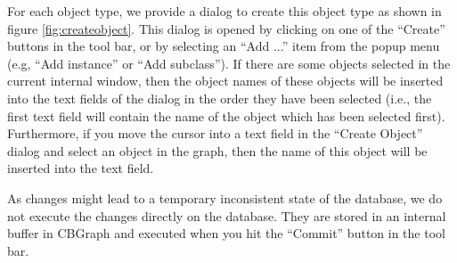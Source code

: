 
For each object type, we provide a dialog to create this object
type as shown in figure \ref{fig:createobject}. This dialog is opened
by clicking on one of the ``Create'' buttons in the tool bar, or by selecting
an ``Add ...'' item from the popup menu (e.g, ``Add instance'' or ``Add subclass'').
If there are some objects selected in the current internal window, then the object names of
these objects will be inserted into the text fields of the dialog in the order they
have been selected (i.e., the first text field will contain the name of the object which
has been selected first). Furthermore, if you move the cursor into a text field in the ``Create Object''
dialog and select an object in the graph, then the name of this object will be inserted
into the text field.

As changes might lead to a temporary inconsistent state of the database, we
do not execute the changes directly on the database. They are stored in an internal
buffer in CBGraph and executed when you hit the ``Commit'' button in
the tool bar.

